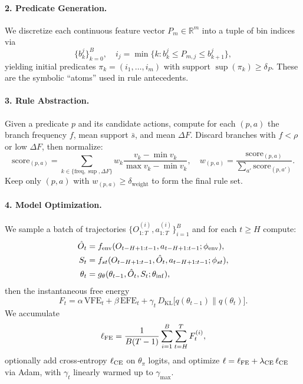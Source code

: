 \documentclass{article} %
\begin{document}
\paragraph{2. Predicate Generation.}  
We discretize each continuous feature vector \(P_m\in\mathbb R^m\) into a tuple of bin indices via
\[
\{b^j_k\}_{k=0}^B,\quad
i_j = \min\{k: b^j_k \le P_{m,j}\le b^j_{k+1}\},
\]
yielding initial predicates
\(\pi_k=(i_1,\dots,i_m)\) with support \(\sup(\pi_k)\ge\delta_P\).  
These are the symbolic ``atoms'' used in rule antecedents.

\paragraph{3. Rule Abstraction.}  
Given a predicate \(p\) and its candidate actions, compute for each \((p,a)\) the branch frequency \(f\), mean support \(\bar s\), and mean \(\Delta F\).  Discard branches with \(f<\rho\) or low \(\Delta F\), then normalize:
\[
\mathrm{score}_{(p,a)}=\sum_{k\in\{\mathrm{freq},\sup,\Delta F\}}
   w_k\frac{v_k-\min v_k}{\max v_k-\min v_k},\quad
w_{(p,a)}=\frac{\mathrm{score}_{(p,a)}}{\sum_{a'}\mathrm{score}_{(p,a')}}.
\]
Keep only \((p,a)\) with \(w_{(p,a)}\ge\delta_{\mathrm{weight}}\) to form the final rule set.

\paragraph{4. Model Optimization.}  
We sample a batch of trajectories \(\{O_{1:T}^{(i)},a_{1:T}^{(i)}\}_{i=1}^B\) and for each \(t\ge H\) compute:
\[
\begin{aligned}
\hat O_t&=f_{\rm env}(O_{t-H+1:t-1},a_{t-H+1:t-1};\phi_{\rm env}),\\
S_t&=f_{st}(O_{t-H+1:t-1},\hat O_t,a_{t-H+1:t-1};\phi_{st}),\\
\theta_t&=g_\theta(\theta_{t-1},\hat O_t,S_t;\theta_{\rm inf}),
\end{aligned}
\]
then the instantaneous free energy
\[
F_t=\alpha\,\mathrm{VFE}_t+\beta\,\mathrm{EFE}_t
     +\gamma_t\,D_{\mathrm{KL}}\bigl[q(\theta_{t-1})\|q(\theta_t)\bigr].
\]
We accumulate
\[
\ell_{\rm FE} = \frac{1}{B(T-1)}\sum_{i=1}^B\sum_{t=H}^T F_t^{(i)},
\]
optionally add cross‐entropy \(\ell_{\rm CE}\) on \(\theta_\pi\) logits, and optimize
\(\ell=\ell_{\rm FE}+\lambda_{\rm CE}\,\ell_{\rm CE}\)
via Adam, with \(\gamma_t\) linearly warmed up to \(\gamma_{\max}\).
\end{document}
